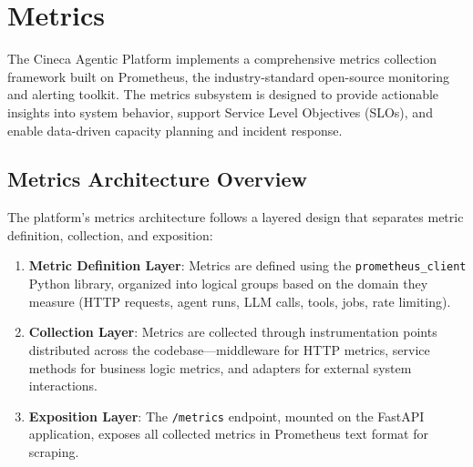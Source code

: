 
\section{Metrics}
\label{sec:metrics}

The Cineca Agentic Platform implements a comprehensive metrics collection framework built on Prometheus, the industry-standard open-source monitoring and alerting toolkit. The metrics subsystem is designed to provide actionable insights into system behavior, support Service Level Objectives (SLOs), and enable data-driven capacity planning and incident response.

\subsection{Metrics Architecture Overview}

The platform's metrics architecture follows a layered design that separates metric definition, collection, and exposition:

\begin{enumerate}
    \item \textbf{Metric Definition Layer}: Metrics are defined using the \texttt{prometheus\_client} Python library, organized into logical groups based on the domain they measure (HTTP requests, agent runs, LLM calls, tools, jobs, rate limiting).
    
    \item \textbf{Collection Layer}: Metrics are collected through instrumentation points distributed across the codebase---middleware for HTTP metrics, service methods for business logic metrics, and adapters for external system interactions.
    
    \item \textbf{Exposition Layer}: The \texttt{/metrics} endpoint, mounted on the FastAPI application, exposes all collected metrics in Prometheus text format for scraping.
\end{enumerate}

